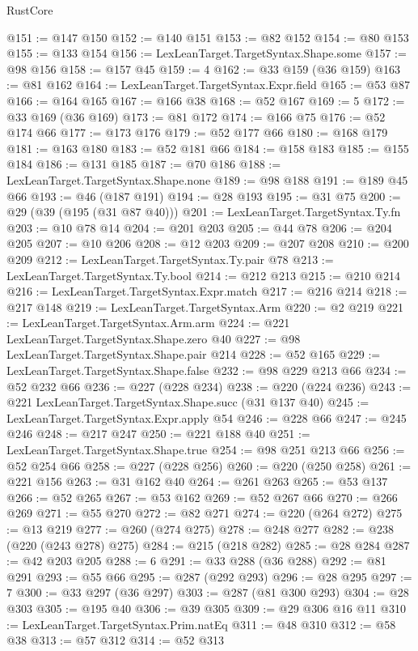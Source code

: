 \begin{lexlean}{RustCore}
\begin{coremodule}
@151 := @147 @150
@152 := @140 @151
@153 := @82 @152
@154 := @80 @153
@155 := @133 @154
@156 := LexLeanTarget.TargetSyntax.Shape.some
@157 := @98 @156
@158 := @157 @45
@159 := 4
@162 := @33 @159 (@36 @159)
@163 := @81 @162
@164 := LexLeanTarget.TargetSyntax.Expr.field
@165 := @53 @87
@166 := @164 @165
@167 := @166 @38
@168 := @52 @167
@169 := 5
@172 := @33 @169 (@36 @169)
@173 := @81 @172
@174 := @166 @75
@176 := @52 @174 @66
@177 := @173 @176
@179 := @52 @177 @66
@180 := @168 @179
@181 := @163 @180
@183 := @52 @181 @66
@184 := @158 @183
@185 := @155 @184
@186 := @131 @185
@187 := @70 @186
@188 := LexLeanTarget.TargetSyntax.Shape.none
@189 := @98 @188
@191 := @189 @45 @66
@193 := @46 (@187 @191)
@194 := @28 @193
@195 := @31 @75
@200 := @29 (@39 (@195 (@31 @87 @40)))
@201 := LexLeanTarget.TargetSyntax.Ty.fn
@203 := @10 @78 @14
@204 := @201 @203
@205 := @44 @78
@206 := @204 @205
@207 := @10 @206
@208 := @12 @203
@209 := @207 @208
@210 := @200 @209
@212 := LexLeanTarget.TargetSyntax.Ty.pair @78
@213 := LexLeanTarget.TargetSyntax.Ty.bool
@214 := @212 @213
@215 := @210 @214
@216 := LexLeanTarget.TargetSyntax.Expr.match
@217 := @216 @214
@218 := @217 @148
@219 := LexLeanTarget.TargetSyntax.Arm
@220 := @2 @219
@221 := LexLeanTarget.TargetSyntax.Arm.arm
@224 := @221 LexLeanTarget.TargetSyntax.Shape.zero @40
@227 := @98 LexLeanTarget.TargetSyntax.Shape.pair @214
@228 := @52 @165
@229 := LexLeanTarget.TargetSyntax.Shape.false
@232 := @98 @229 @213 @66
@234 := @52 @232 @66
@236 := @227 (@228 @234)
@238 := @220 (@224 @236)
@243 := @221 LexLeanTarget.TargetSyntax.Shape.succ (@31 @137 @40)
@245 := LexLeanTarget.TargetSyntax.Expr.apply @54
@246 := @228 @66
@247 := @245 @246
@248 := @217 @247
@250 := @221 @188 @40
@251 := LexLeanTarget.TargetSyntax.Shape.true
@254 := @98 @251 @213 @66
@256 := @52 @254 @66
@258 := @227 (@228 @256)
@260 := @220 (@250 @258)
@261 := @221 @156
@263 := @31 @162 @40
@264 := @261 @263
@265 := @53 @137
@266 := @52 @265
@267 := @53 @162
@269 := @52 @267 @66
@270 := @266 @269
@271 := @55 @270
@272 := @82 @271
@274 := @220 (@264 @272)
@275 := @13 @219
@277 := @260 (@274 @275)
@278 := @248 @277
@282 := @238 (@220 (@243 @278) @275)
@284 := @215 (@218 @282)
@285 := @28 @284
@287 := @42 @203 @205
@288 := 6
@291 := @33 @288 (@36 @288)
@292 := @81 @291
@293 := @55 @66
@295 := @287 (@292 @293)
@296 := @28 @295
@297 := 7
@300 := @33 @297 (@36 @297)
@303 := @287 (@81 @300 @293)
@304 := @28 @303
@305 := @195 @40
@306 := @39 @305
@309 := @29 @306 @16 @11
@310 := LexLeanTarget.TargetSyntax.Prim.natEq
@311 := @48 @310
@312 := @58 @38
@313 := @57 @312
@314 := @52 @313

\end{coremodule}
\end{lexlean}
